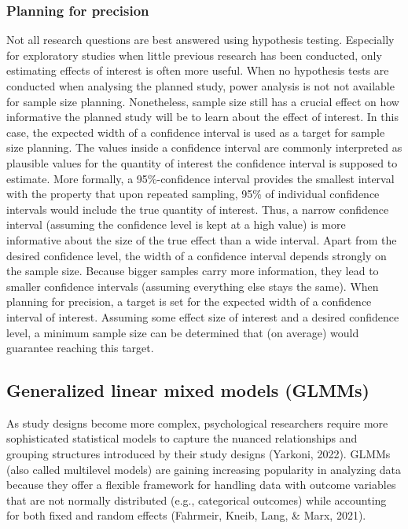 \documentclass[
  man,floatsintext]{apa6}
\begin{document}
\hypertarget{planning-for-precision}{%
\subsubsection{Planning for precision}\label{planning-for-precision}}

Not all research questions are best answered using hypothesis testing.
Especially for exploratory studies when little previous research has been conducted, only estimating effects of interest is often more useful.
When no hypothesis tests are conducted when analysing the planned study, power analysis is not not available for sample size planning.
Nonetheless, sample size still has a crucial effect on how informative the planned study will be to learn about the effect of interest.
In this case, the expected width of a confidence interval is used as a target for sample size planning.
The values inside a confidence interval are commonly interpreted as plausible values for the quantity of interest the confidence interval is supposed to estimate.
More formally, a 95\%-confidence interval provides the smallest interval with the property that upon repeated sampling, 95\% of individual confidence intervals would include the true quantity of interest.
Thus, a narrow confidence interval (assuming the confidence level is kept at a high value) is more informative about the size of the true effect than a wide interval.
Apart from the desired confidence level, the width of a confidence interval depends strongly on the sample size.
Because bigger samples carry more information, they lead to smaller confidence intervals (assuming everything else stays the same).
When planning for precision, a target is set for the expected width of a confidence interval of interest.
Assuming some effect size of interest and a desired confidence level, a minimum sample size can be determined that (on average) would guarantee reaching this target.

\hypertarget{generalized-linear-mixed-models-glmms}{%
\subsection{Generalized linear mixed models (GLMMs)}\label{generalized-linear-mixed-models-glmms}}

As study designs become more complex, psychological researchers require more sophisticated statistical models to capture the nuanced relationships and grouping structures introduced by their study designs (Yarkoni, 2022).
GLMMs (also called multilevel models) are gaining increasing popularity in analyzing data because they offer a flexible framework for handling data with outcome variables that are not normally distributed (e.g., categorical outcomes) while accounting for both fixed and random effects (Fahrmeir, Kneib, Lang, \& Marx, 2021).
\end{document}
